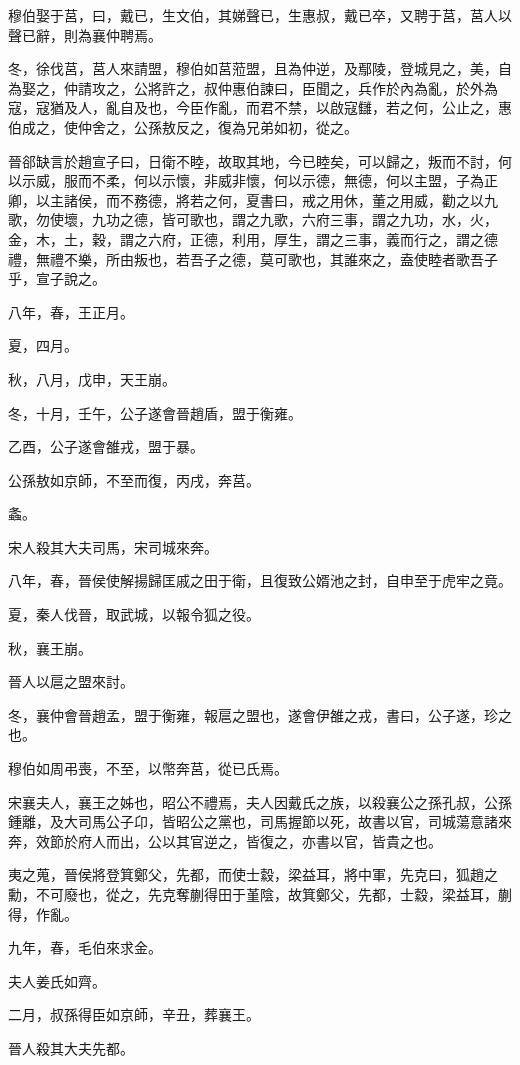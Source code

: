 \begin{pinyinscope}
穆伯娶于莒，曰，戴已，生文伯，其娣聲已，生惠叔，戴已卒，又聘于莒，莒人以聲已辭，則為襄仲聘焉。

冬，徐伐莒，莒人來請盟，穆伯如莒蒞盟，且為仲逆，及鄢陵，登城見之，美，自為娶之，仲請攻之，公將許之，叔仲惠伯諫曰，臣聞之，兵作於內為亂，於外為寇，寇猶及人，亂自及也，今臣作亂，而君不禁，以啟寇讎，若之何，公止之，惠伯成之，使仲舍之，公孫敖反之，復為兄弟如初，從之。

晉郤缺言於趙宣子曰，日衛不睦，故取其地，今已睦矣，可以歸之，叛而不討，何以示威，服而不柔，何以示懷，非威非懷，何以示德，無德，何以主盟，子為正卿，以主諸侯，而不務德，將若之何，夏書曰，戒之用休，董之用威，勸之以九歌，勿使壞，九功之德，皆可歌也，謂之九歌，六府三事，謂之九功，水，火，金，木，土，穀，謂之六府，正德，利用，厚生，謂之三事，義而行之，謂之德禮，無禮不樂，所由叛也，若吾子之德，莫可歌也，其誰來之，盍使睦者歌吾子乎，宣子說之。

八年，春，王正月。

夏，四月。

秋，八月，戊申，天王崩。

冬，十月，壬午，公子遂會晉趙盾，盟于衡雍。

乙酉，公子遂會雒戎，盟于暴。

公孫敖如京師，不至而復，丙戌，奔莒。

螽。

宋人殺其大夫司馬，宋司城來奔。

八年，春，晉侯使解揚歸匡戚之田于衛，且復致公婿池之封，自申至于虎牢之竟。

夏，秦人伐晉，取武城，以報令狐之役。

秋，襄王崩。

晉人以扈之盟來討。

冬，襄仲會晉趙孟，盟于衡雍，報扈之盟也，遂會伊雒之戎，書曰，公子遂，珍之也。

穆伯如周弔喪，不至，以幣奔莒，從已氏焉。

宋襄夫人，襄王之姊也，昭公不禮焉，夫人因戴氏之族，以殺襄公之孫孔叔，公孫鍾離，及大司馬公子卬，皆昭公之黨也，司馬握節以死，故書以官，司城蕩意諸來奔，效節於府人而出，公以其官逆之，皆復之，亦書以官，皆貴之也。

夷之蒐，晉侯將登箕鄭父，先都，而使士縠，梁益耳，將中軍，先克曰，狐趙之勳，不可廢也，從之，先克奪蒯得田于堇陰，故箕鄭父，先都，士縠，梁益耳，蒯得，作亂。

九年，春，毛伯來求金。

夫人姜氏如齊。

二月，叔孫得臣如京師，辛丑，葬襄王。

晉人殺其大夫先都。


\end{pinyinscope}
